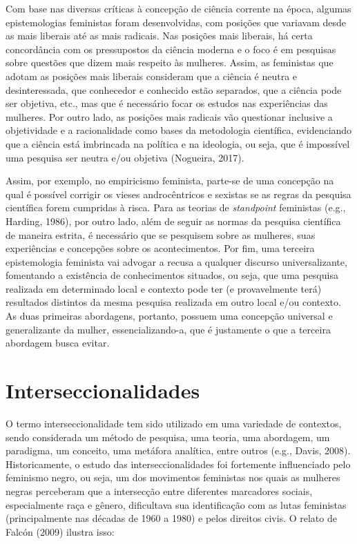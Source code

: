 Com base nas diversas críticas à concepção de ciência corrente na época, algumas epistemologias feministas foram desenvolvidas, com posições que variavam desde as mais liberais até as mais radicais. Nas posições mais liberais, há certa concordância com os pressupostos da ciência moderna e o foco é em pesquisas sobre questões que dizem mais respeito às mulheres. Assim, as feministas que adotam as posições mais liberais consideram que a ciência é neutra e desinteressada, que conhecedor e conhecido estão separados, que a ciência pode ser objetiva, etc., mas que é necessário focar os estudos nas experiências das mulheres. Por outro lado, as posições mais radicais vão questionar inclusive a objetividade e a racionalidade como bases da metodologia científica, evidenciando que a ciência está imbrincada na política e na ideologia, ou seja, que é impossível uma pesquisa ser neutra e/ou objetiva (Nogueira, 2017).

Assim, por exemplo, no empiricismo feminista, parte-se de uma concepção na qual é possível corrigir os vieses androcêntricos e sexistas se as regras da pesquisa científica forem cumpridas à risca. Para as teorias de \textit{standpoint} feministas (e.g., Harding, 1986), por outro lado, além de seguir as normas da pesquisa científica de maneira estrita, é necessário que se pesquisem sobre as mulheres, suas experiências e concepções sobre os acontecimentos. Por fim, uma terceira epistemologia feminista vai advogar a recusa a qualquer discurso universalizante, fomentando a existência de conhecimentos situados, ou seja, que uma pesquisa realizada em determinado local e contexto pode ter (e provavelmente terá) resultados distintos da mesma pesquisa realizada em outro local e/ou contexto. As duas primeiras abordagens, portanto, possuem uma concepção universal e generalizante da mulher, essencializando-a, que é justamente o que a terceira abordagem busca evitar.

\section{Interseccionalidades}

O termo interseccionalidade tem sido utilizado em uma variedade de contextos, sendo considerada um método de pesquisa, uma teoria, uma abordagem, um paradigma, um conceito, uma metáfora analítica, entre outros (e.g., Davis, 2008). Historicamente, o estudo das interseccionalidades foi fortemente influenciado pelo feminismo negro, ou seja, um dos movimentos feministas nos quais as mulheres negras perceberam que a intersecção entre diferentes marcadores sociais, especialmente raça e gênero, dificultava sua identificação com as lutas feministas (principalmente nas décadas de 1960 a 1980) e pelos direitos civis. O relato de Falcón (2009) ilustra isso:

